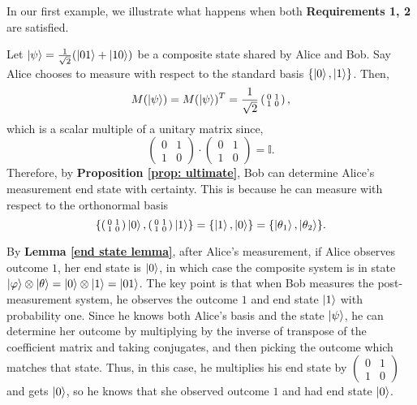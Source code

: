 In our first example, we illustrate what happens when both {\bf{Requirements 1, 2}} are satisfied.
\begin{example}
\label{example good}
Let $\ket{\psi}=\frac{1}{\sqrt{2}}(\ket{01}+\ket{10})$ be a composite state shared by Alice and Bob.  Say Alice chooses to measure with respect to the standard basis $\{\ket{0}, \ket{1}\}$.  Then,
\begin{equation*}
M(\ket{\psi})=M(\ket{\psi})^T= \frac{1}{\sqrt{2}}\left(\begin{smallmatrix}0 & 1\\1 & 0\end{smallmatrix}\right),
\end{equation*}
which is a scalar multiple of a unitary matrix since,
\begin{equation*}
\left(\begin{smallmatrix}0 & 1\\1 & 0\end{smallmatrix}\right)\cdot \left(\begin{smallmatrix}0 & 1\\1 & 0\end{smallmatrix}\right)=\mathbb{I}.
\end{equation*}
Therefore, by \textbf{Proposition \ref{prop: ultimate}}, Bob can determine Alice's measurement end state with certainty. This is because he can measure with respect to the orthonormal basis
\begin{equation*}
\{\left(\begin{smallmatrix}0 & 1\\1 & 0\end{smallmatrix}\right)\ket{0}, \left(\begin{smallmatrix}0 & 1\\1 & 0\end{smallmatrix}\right)\ket{1}\}=\{\ket{1}, \ket{0}\}=\{\ket{\theta_1},\ket{\theta_2}\}.
\end{equation*}

By \textbf{Lemma \ref{end state lemma}}, after Alice's measurement, if Alice observes outcome $1$, her end state is $\ket{0}$, in which case the composite system is in state $\ket{\varphi}\otimes \ket{\theta}=\ket{0}\otimes\ket{1}=\ket{01}$.  The key point is that when Bob measures the post-measurement system, he observes the outcome $1$ and end state $\ket{1}$ with probability one.  Since he knows both Alice's basis and the state $\ket{\psi}$, he can determine her outcome by multiplying by the inverse of transpose of the coefficient matrix and taking conjugates, and then picking the outcome which matches that state.  Thus, in this case, he multiplies his end state by $\left(\begin{smallmatrix}0&1\\1&0\end{smallmatrix}\right)$ and gets $\ket{0}$, so he knows that she observed outcome $1$  and had end state $\ket{0}$.


\end{example}
